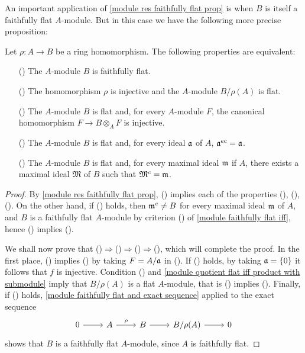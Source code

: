An important application of \cref{module res faithfully flat prop} is when $B$ is itself a faithfully flat $A$-module. But in this case we have the following more precise proposition:
\begin{proposition}\label{ring faithfully flat iff}
Let $\rho:A\to B$ be a ring homomorphism. The following properties are equivalent:
\begin{itemize}
\item[(\rmnum{1})] The $A$-module $B$ is faithfully flat.
\item[(\rmnum{2})] The homomorphism $\rho$ is injective and the $A$-module $B/\rho(A)$ is flat.
\item[(\rmnum{3})] The $A$-module $B$ is flat and, for every $A$-module $F$, the canonical homomorphism $F\to B\otimes_AF$ is injective.
\item[(\rmnum{4})] The $A$-module $B$ is flat and, for every ideal $\mathfrak{a}$ of $A$, $\mathfrak{a}^{ec}=\mathfrak{a}$.
\item[(\rmnum{5})] The $A$-module $B$ is flat and, for every maximal ideal $\mathfrak{m}$ if $A$, there exists a maximal ideal $\mathfrak{M}$ of $B$ such that $\mathfrak{M}^c=\mathfrak{m}$.
\end{itemize}
\end{proposition}
\begin{proof}
By \cref{module res faithfully flat prop}, () implies each of the properties (), (), (). On the other hand, if () holds, then $\mathfrak{m}^e\neq B$ for every maximal ideal $\mathfrak{m}$ of $A$, and $B$ is a faithfully flat $A$-module by criterion () of \cref{module faithfully flat iff}, hence () implies ().\par
We shall now prove that ()$\Rightarrow$()$\Rightarrow$()$\Rightarrow$(), which will complete the proof. In the first place, () implies () by taking $F=A/\mathfrak{a}$ in (). If () holds, by taking $\mathfrak{a}=\{0\}$ it follows that $f$ is injective. Condition () and \cref{module quotient flat iff product with submodule} imply that $B/\rho(A)$ is a flat $A$-module, that is () implies (). Finally, if () holds, \cref{module faithfully flat and exact sequence} applied to the exact sequence
\[\begin{tikzcd}
0\ar[r]&A\ar[r,"\rho"]&B\ar[r]&B/\rho(A)\ar[r]&0
\end{tikzcd}\]
shows that $B$ is a faithfully flat $A$-module, since $A$ is faithfully flat.
\end{proof}

